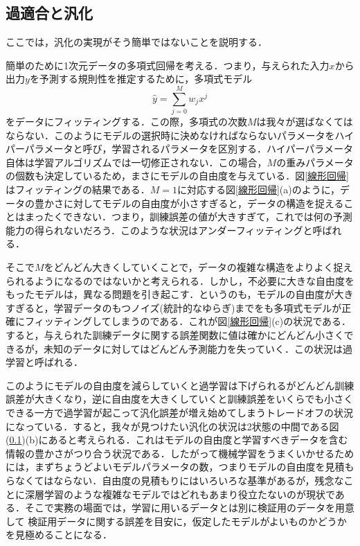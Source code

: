 \documentclass[a4paper,11pt]{jsreport}
\begin{document}
\subsection{過適合と汎化}
ここでは，汎化の実現がそう簡単ではないことを説明する．\par
簡単のために1次元データの多項式回帰を考える．つまり，与えられた入力$x$から出力$y$を予測する規則性を推定するために，多項式モデル
\begin{equation}
  \hat{y} = \sum_{j=0}^M w_j x^j
\end{equation}
をデータにフィッティングする．この際，多項式の次数$M$は我々が選ばなくてはならない．このようにモデルの選択時に決めなければならないパラメータをハイパーパラメータと呼び，学習されるパラメータを区別する．ハイパーパラメータ自体は学習アルゴリズムでは一切修正されない．この場合，$M$の重みパラメータの個数も決定しているため，まさにモデルの自由度を与えている．図\ref{線形回帰}はフィッティングの結果である．$M=1$に対応する図\ref{線形回帰}(a)のように，データの豊かさに対してモデルの自由度が小さすぎると，データの構造を捉えることはまったくできない．つまり，訓練誤差の値が大きすぎて，これでは何の予測能力の得られないだろう．このような状況はアンダーフィッティングと呼ばれる．\par
そこで$M$をどんどん大きくしていくことで，データの複雑な構造をよりよく捉えられるようになるのではないかと考えられる．しかし，不必要に大きな自由度をもったモデルは，異なる問題を引き起こす．というのも，モデルの自由度が大きすぎると，学習データのもつノイズ(統計的なゆらぎ)までをも多項式モデルが正確にフィッティングしてしまうのである．これが図\ref{線形回帰}(c)の状況である．すると，与えられた訓練データに関する誤差関数に値は確かにどんどん小さくできるが，未知のデータに対してはどんどん予測能力を失っていく．この状況は過学習と呼ばれる．\par
このようにモデルの自由度を減らしていくと過学習は下げられるがどんどん訓練誤差が大きくなり，逆に自由度を大きくしていくと訓練誤差をいくらでも小さくできる一方で過学習が起こって汎化誤差が増え始めてしまうトレードオフの状況になっている．すると，我々が見つけたい汎化の状況は2状態の中間である図(\ref{})(b)にあると考えられる．これはモデルの自由度と学習すべきデータを含む情報の豊かさがつり合う状況である．したがって機械学習をうまくいかせるためには，まずちょうどよいモデルパラメータの数，つまりモデルの自由度を見積もらなくてはならない．自由度の見積もりにはいろいろな基準があるが，残念なことに深層学習のような複雑なモデルではどれもあまり役立たないのが現状である．そこで実務の場面では，学習に用いるデータとは別に検証用のデータを用意して
検証用データに関する誤差を目安に，仮定したモデルがよいものかどうかを見極めることになる．
\end{document}
